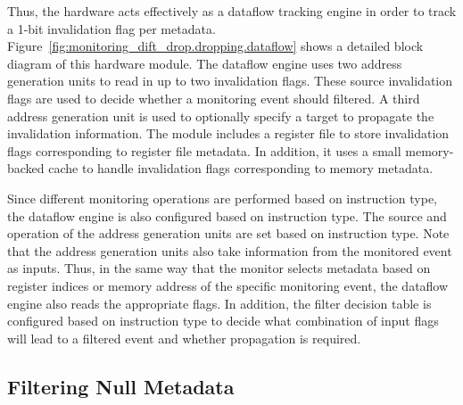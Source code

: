 Thus, the hardware acts effectively as a dataflow tracking engine in order to
track a 1-bit invalidation flag per metadata.
Figure~\ref{fig:monitoring_dift_drop.dropping.dataflow} shows a detailed block
diagram of this hardware module. The dataflow engine uses two address
generation units to read in up to two invalidation flags. These source
invalidation flags are used to decide whether a monitoring event should
filtered. A third address generation unit is used to optionally specify a
target to propagate the invalidation information. The module includes a
register file to store invalidation flags corresponding to register file
metadata. In addition, it uses a small memory-backed cache to handle
invalidation flags corresponding to memory metadata.

Since different monitoring operations are performed based on instruction type,
the dataflow engine is also configured based on instruction type. The source
and operation of the address generation units are set based on instruction
type. Note that the address generation units also take information from the
monitored event as inputs. Thus, in the same way that the monitor selects
metadata based on register indices or memory address of the specific monitoring
event, the dataflow engine also reads the appropriate flags. In addition, the
filter decision table is configured based on instruction type to decide what
combination of input flags will lead to a filtered event and whether
propagation is required.

\subsection{Filtering Null Metadata}
\label{sec:monitoring_dift_drop.dropping.null_filtering}

